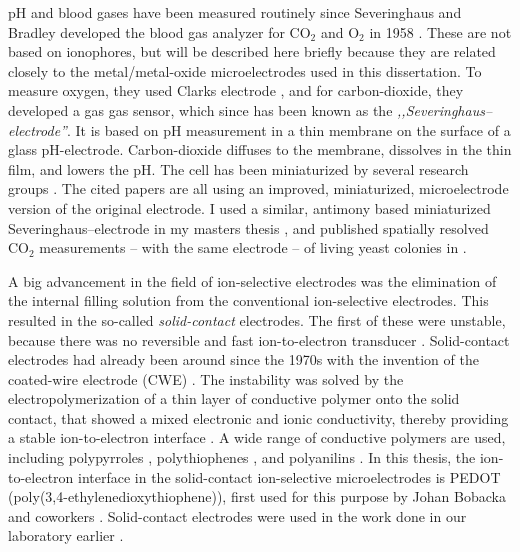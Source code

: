 pH and blood gases have been measured routinely since Severinghaus and Bradley developed the blood gas analyzer for CO$_2$ and O$_2$ in 1958 \cite{severinghaus1958electrodes}.
These are not based on ionophores, but will be described here briefly because they are related closely to the metal/metal-oxide microelectrodes used in this dissertation.
To measure oxygen, they used Clarks electrode \cite{clark1953continuous}, and for carbon-dioxide, they developed a gas gas sensor, which since has been known as the \emph{,,Severinghaus--electrode''}.
It is based on pH measurement in a thin membrane on the surface of a glass pH-electrode.
Carbon-dioxide diffuses to the membrane, dissolves in the thin film, and lowers the pH.
The cell has been miniaturized by several research groups \cite{cai1993development, de1997fast, zhao1997improved, hanstein2001miniaturised, beyenal2004improved}.
The cited papers are all using an improved, miniaturized, microelectrode version of the original electrode.
I used a similar, antimony based miniaturized Severinghaus--electrode in my masters thesis \cite{msc2011}, and published spatially resolved CO$_2$ measurements -- with the same electrode -- of living yeast colonies in \cite{kiss2011air}.

A big advancement in the field of ion-selective electrodes was the elimination of the internal filling solution from the conventional ion-selective electrodes.
This resulted in the so-called \emph{solid-contact} electrodes.
The first of these were unstable, because there was no reversible and fast ion-to-electron transducer \cite{nikolskii1985solid}.
Solid-contact electrodes had already been around since the 1970s with the invention of the coated-wire electrode (CWE) \cite{cattrall1971coated}.
The instability was solved by the electropolymerization of a thin layer of conductive polymer onto the solid contact, that showed a mixed electronic and ionic conductivity, thereby providing a stable ion-to-electron interface \cite{bobacka2003potentiometric, bobacka2004all, bobacka2006conducting, michalska2006optimizing}.
A wide range of conductive polymers are used, including polypyrroles \cite{sun2004construction}, polythiophenes \cite{bobacka1994all}, and polyanilins \cite{paciorek2005miniature}.
In this thesis, the ion-to-electron interface in the solid-contact ion-selective microelectrodes is PEDOT (poly(3,4-ethylenedioxythiophene)), first used for this purpose by Johan Bobacka and coworkers \cite{bobacka1994all}.
Solid-contact electrodes were used in the work done in our laboratory earlier \cite{gyetvai2007solid, varga2011development, izquierdo2012scanning}.

